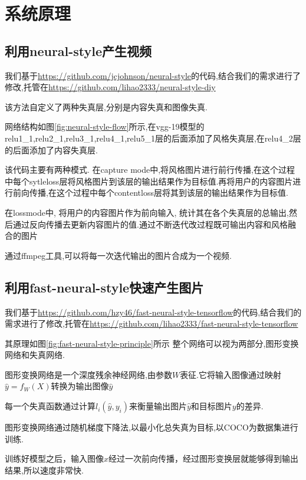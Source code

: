 \section{系统原理}
\subsection{利用neural-style产生视频}
我们基于\url{https://github.com/jcjohnson/neural-style}的代码,结合我们的需求进行了修改,托管在\url{https://github.com/lihao2333/neural-style-diy}

该方法自定义了两种失真层,分别是内容失真和图像失真.

网络结构如图\ref{fig:neural-style-flow}所示,在vgg-19模型的relu1\_1,relu2\_1,relu3\_1,relu4\_1,relu5\_1层的后面添加了风格失真层,在relu4\_2层的后面添加了内容失真层.

该代码主要有两种模式. 在capture mode中,将风格图片进行前行传播,在这个过程中每个sytleloss层将风格图片到该层的输出结果作为目标值.再将用户的内容图片进行前向传播,在这个过程中每个contentloss层将其到该层的输出结果作为目标值.

在lossmode中, 将用户的内容图片作为前向输入, 统计其在各个失真层的总输出,然后通过反向传播去更新内容图片的值.通过不断迭代改过程既可输出内容和风格融合的图片

通过ffmpeg工具,可以将每一次迭代输出的图片合成为一个视频.
\subsection{利用fast-neural-style快速产生图片}
我们基于\url{https://github.com/hzy46/fast-neural-style-tensorflow}的代码,结合我们的需求进行了修改,托管在\url{https://github.com/lihao2333/fast-neural-style-tensorflow}

其原理如图\ref{fig:fast-neural-style-principle}所示
整个网络可以视为两部分,图形变换网络和失真网络.

图形变换网络是一个深度残余神经网络,由参数$W$表征.它将输入图像通过映射$\hat y=f_W(X)$转换为输出图像$\hat y$

每一个失真函数通过计算$l_i(\hat y,y_i)$来衡量输出图片$\hat y$和目标图片$y$的差异.

图形变换网络通过随机梯度下降法,以最小化总失真为目标,以COCO为数据集进行训练.

训练好模型之后，输入图像$x$经过一次前向传播，经过图形变换层就能够得到输出结果,所以速度非常快.

